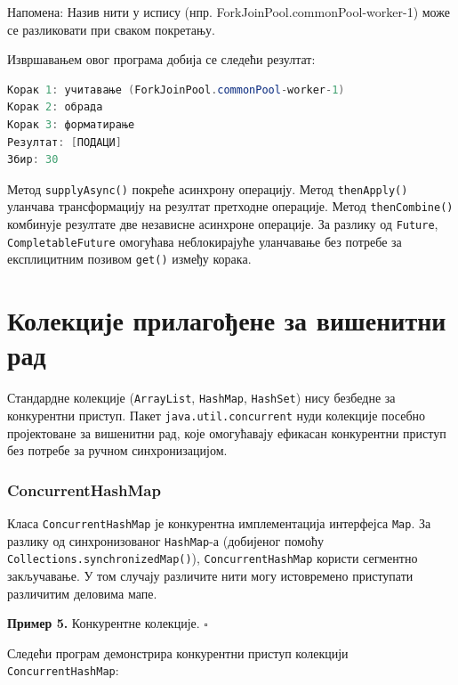 Напомена: Назив нити у испису (нпр. ForkJoinPool.commonPool-worker-1) може се разликовати при сваком покретању.

Извршавањем овог програма добија се следећи резултат:


\begin{lstlisting}[language=Java]
Корак 1: учитавање (ForkJoinPool.commonPool-worker-1)
Корак 2: обрада
Корак 3: форматирање
Резултат: [ПОДАЦИ]
Збир: 30
\end{lstlisting}


Метод \texttt{supplyAsync()} покреће асинхрону операцију. Метод \texttt{thenApply()} уланчава трансформацију на резултат претходне операције. Метод \texttt{thenCombine()} комбинује резултате две независне асинхроне операције. За разлику од \texttt{Future}, \texttt{CompletableFuture} омогућава неблокирајуће уланчавање без потребе за експлицитним позивом \texttt{get()} између корака.


\section{Колекције прилагођене за вишенитни рад}

Стандардне колекције (\texttt{ArrayList}, \texttt{HashMap}, \texttt{HashSet}) нису безбедне за конкурентни приступ. Пакет \texttt{java.util.concurrent} нуди колекције посебно пројектоване за вишенитни рад, које омогућавају ефикасан конкурентни приступ без потребе за ручном синхронизацијом.


\subsubsection{ConcurrentHashMap}

Класа \texttt{ConcurrentHashMap} је конкурентна имплементација интерфејса \texttt{Map}. За разлику од синхронизованог \texttt{HashMap}-а (добијеног помоћу \texttt{Collections.synchronizedMap()}), \texttt{ConcurrentHashMap} користи сегментно закључавање. У том случају различите нити могу истовремено приступати различитим деловима мапе.


\bigskip

\noindent \textbf{Пример 5.} Конкурентне колекције. $\square$

\medskip

Следећи програм демонстрира конкурентни приступ колекцији \texttt{ConcurrentHashMap}:


